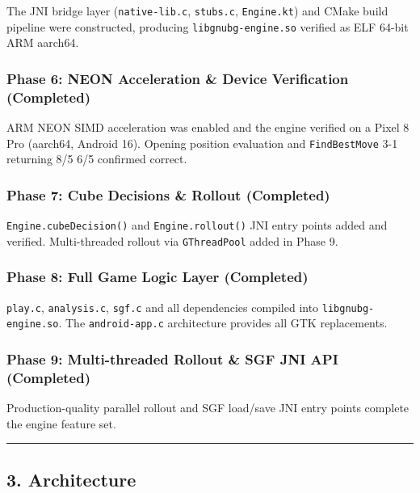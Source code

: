 \documentclass[11pt,a4paper]{article}
\begin{document}
The JNI bridge layer (\texttt{native-lib.c}, \texttt{stubs.c},
\texttt{Engine.kt}) and CMake build pipeline were constructed, producing
\texttt{libgnubg-engine.so} verified as ELF 64-bit ARM aarch64.

\subsubsection{Phase 6: NEON Acceleration \& Device Verification (Completed)}\label{phase-6}

ARM NEON SIMD acceleration was enabled and the engine verified on a
Pixel 8 Pro (aarch64, Android 16). Opening position evaluation and
\texttt{FindBestMove} 3-1 returning 8/5 6/5 confirmed correct.

\subsubsection{Phase 7: Cube Decisions \& Rollout (Completed)}\label{phase-7}

\texttt{Engine.cubeDecision()} and \texttt{Engine.rollout()} JNI entry
points added and verified. Multi-threaded rollout via \texttt{GThreadPool}
added in Phase 9.

\subsubsection{Phase 8: Full Game Logic Layer (Completed)}\label{phase-8}

\texttt{play.c}, \texttt{analysis.c}, \texttt{sgf.c} and all
dependencies compiled into \texttt{libgnubg-engine.so}. The
\texttt{android-app.c} architecture provides all GTK replacements.

\subsubsection{Phase 9: Multi-threaded Rollout \& SGF JNI API (Completed)}\label{phase-9}

Production-quality parallel rollout and SGF load/save JNI entry points
complete the engine feature set.

\begin{center}\rule{0.5\linewidth}{0.5pt}\end{center}

\subsection{3. Architecture}\label{architecture}
\end{document}
